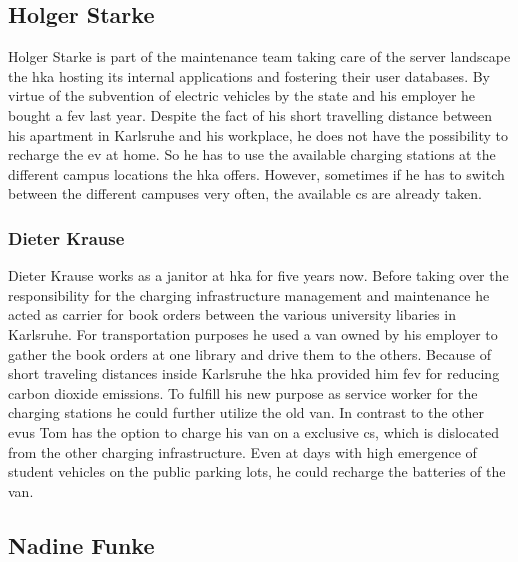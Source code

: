 \subsection{Holger Starke}
\label{ch:Requirements Engineering:sec:Personas:ssec:Holger Starke}

Holger Starke is part of the maintenance team taking care of the server landscape the \acrshort{hka} hosting its internal applications and fostering their user databases. By virtue of the subvention of electric vehicles by the state and his employer he bought a \acrshort{fev} last year. Despite the fact of his short travelling distance between his apartment in Karlsruhe and his workplace, he does not have the possibility to recharge the \acrshort{ev} at home. So he has to use the available charging stations at the different campus locations the \acrshort{hka} offers. However, sometimes if he has to switch between the different campuses very often, the available \acrshort{cs} are already taken.

\subsubsection{Dieter Krause}
\label{ch:Requirements Engineering:sec:Personas:ssec:Tom Krause}

Dieter Krause works as a janitor at \acrshort{hka} for five years now. Before taking over the responsibility for the charging infrastructure management and maintenance he acted as carrier for book orders between the various university libaries in Karlsruhe. For transportation purposes he used a van owned by his employer to gather the book orders at one library and drive them to the others. Because of short traveling distances inside Karlsruhe the \acrshort{hka} provided him \acrshort{fev} for reducing carbon dioxide emissions. To fulfill his new purpose as service worker for the charging stations he could further utilize the old van. In contrast to the other \acrshort{evu}s Tom has the option to charge his van on a exclusive \acrshort{cs}, which is dislocated from the other charging infrastructure. Even at days with high emergence of student vehicles on the public parking lots, he could recharge the batteries of the van. 

\subsection{Nadine Funke}
\label{ch:Requirements Engineering:sec:Personas:ssec:Nadine Funke}

